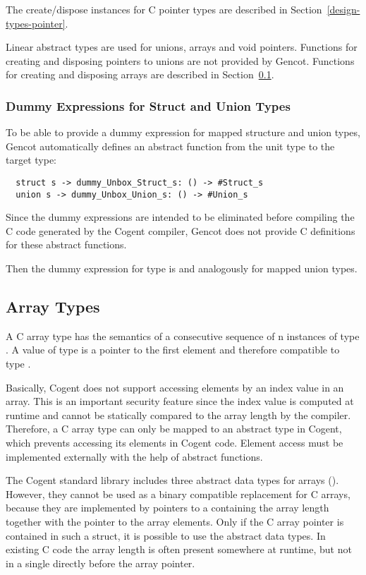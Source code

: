 The create/dispose instances for C pointer types are described in Section~\ref{design-types-pointer}.

Linear abstract types are used for unions, arrays and void pointers. Functions for creating and disposing pointers
to unions are not provided by Gencot. Functions for creating and disposing arrays are described in 
Section~\ref{design-types-array}.

\subsubsection{Dummy Expressions for Struct and Union Types}

To be able to provide a dummy expression for mapped structure and union types, Gencot automatically defines an 
abstract function from the unit type to the target type:
\begin{verbatim}
  struct s -> dummy_Unbox_Struct_s: () -> #Struct_s
  union s -> dummy_Unbox_Union_s: () -> #Union_s
\end{verbatim}
Since the dummy expressions are intended to be eliminated before compiling the 
C code generated by the Cogent compiler, Gencot does not provide C definitions for these abstract functions. 

Then the dummy expression for type  is  and analogously
for mapped union types. 

\subsection{Array Types}
\label{design-types-array}

A C array type  has the semantics of a consecutive sequence of n instances of type . A value
of type  is a pointer to the first element and therefore compatible to type .

Basically, Cogent does not support accessing elements by an index value in an array. 
This is an important security feature since the index value is computed at runtime and cannot be statically 
compared to the array length by the compiler. Therefore, a C array type can only be mapped to an abstract type 
in Cogent, which prevents accessing its elements in Cogent code. Element access must be implemented externally 
with the help of abstract functions.

The Cogent standard library includes three abstract data types for arrays (). 
However, they cannot be used as a binary compatible replacement for C arrays, because they are implemented by 
pointers to a  containing the array length together with the pointer to the array elements. 
Only if the C array pointer is contained in such a struct, it is possible to use the abstract data types. 
In existing C code the array length is often present somewhere at runtime, but not in a single 
directly before the array pointer.

